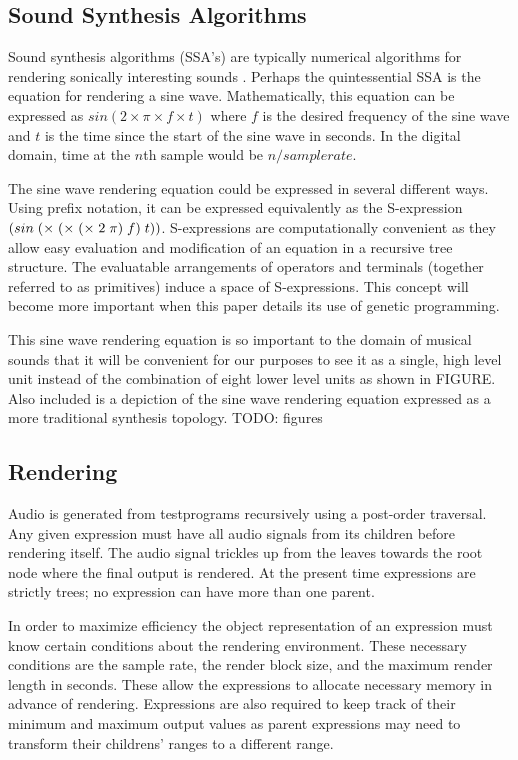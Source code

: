 \documentclass[12pt]{article}
\newcommand{\audiolanguagenamelower}{test}
\begin{document}
\subsection{Sound Synthesis Algorithms}\label{SSA}
Sound synthesis algorithms (SSA's) are typically numerical algorithms for rendering sonically interesting sounds \citep{tolonen1998evaluation}. Perhaps the quintessential SSA is the equation for rendering a sine wave. Mathematically, this equation can be expressed as $sin (2 \times \pi \times f \times t)$ where $f$ is the desired frequency of the sine wave and $t$ is the time since the start of the sine wave in seconds. In the digital domain, time at the $n$th sample would be $n/sample rate$.
	
The sine wave rendering equation could be expressed in several different ways. Using prefix notation, it can be expressed equivalently as the S-expression $\sexp{({sin} (\times (\times (\times 2 \pi) f) t))}$. S-expressions are computationally convenient as they allow easy evaluation and modification of an equation in a recursive tree structure. The evaluatable arrangements of operators and terminals (together referred to as primitives) induce a space of S-expressions. This concept will become more important when this paper details its use of genetic programming.
	
This sine wave rendering equation is so important to the domain of musical sounds that it will be convenient for our purposes to see it as a single, high level unit instead of the combination of eight lower level units as shown in FIGURE. Also included is a depiction of the sine wave rendering equation expressed as a more traditional synthesis topology. TODO: figures

\subsection{Rendering}\label{PROCESSING}
Audio is generated from \audiolanguagenamelower programs recursively using a post-order traversal. Any given expression must have all audio signals from its children before rendering itself. The audio signal trickles up from the leaves towards the root node where the final output is rendered. At the present time expressions are strictly trees; no expression can have more than one parent.

In order to maximize efficiency the object representation of an expression must know certain conditions about the rendering environment. These necessary conditions are the sample rate, the render block size, and the maximum render length in seconds. These allow the expressions to allocate necessary memory in advance of rendering. Expressions are also required to keep track of their minimum and maximum output values as parent expressions may need to transform their childrens' ranges to a different range.
\end{document}
